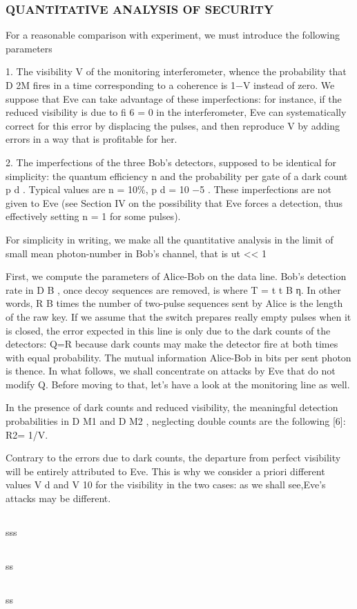\subsubsection{QUANTITATIVE ANALYSIS OF SECURITY}

For a reasonable comparison with experiment, we must introduce the following parameters

1. The visibility V of the monitoring interferometer, whence the probability that D 2M fires in a time corresponding to a coherence is 1−V instead of zero. We suppose that Eve can take advantage of these imperfections: for instance, if the reduced visibility is due to fi 6 = 0 in the interferometer, Eve can systematically correct for this error by displacing the pulses, and then reproduce V by adding errors in a way that is profitable for her.

2. The imperfections of the three Bob’s detectors, supposed to be identical for simplicity: the quantum efficiency n and the probability per gate of a dark count p d . Typical values are n = 10\%, p d = 10 −5 . These imperfections are not given to Eve (see Section IV on the possibility that Eve forces a detection, thus effectively setting n = 1 for some pulses).

For simplicity in writing, we make all the quantitative analysis in the limit of small mean photon-number in Bob’s channel, that is ut << 1

First, we compute the parameters of Alice-Bob on the data line. Bob’s detection rate in D B , once decoy sequences are removed, is where T = t t B η. In other words, R B times the number of two-pulse sequences sent by Alice is the length of the raw key.
If we assume that the switch prepares really empty pulses when it is closed, the error expected in this line is only due to the dark counts of the detectors: Q=R because dark counts may make the detector fire at both times with equal probability. The mutual information Alice-Bob in bits per sent photon is thence. In what follows, we shall concentrate on attacks by Eve that do not modify Q. Before moving to that, let’s have a look at the monitoring line as well.

In the presence of dark counts and reduced visibility, the meaningful detection probabilities in D M1 and D M2 , neglecting double counts are the following [6]: R2= 1/V.

Contrary to the errors due to dark counts, the departure from perfect visibility will be entirely attributed to Eve. This is why we consider a priori different values V d and V 10 for the visibility in the two cases: as we shall see,Eve’s attacks may be different.



\subsection{\trnas}
sss
\subsection{\review}
ss
\subsection{\dic}
ss